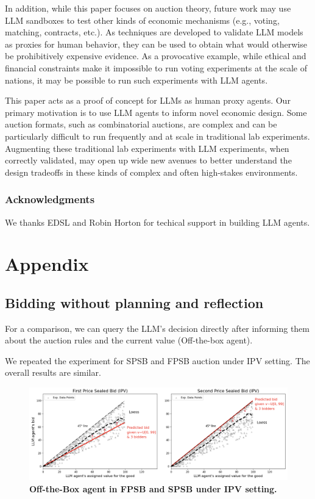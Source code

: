 \documentclass{article} %
\begin{document}
In addition, while this paper focuses on auction theory, future work may use LLM sandboxes to test other  kinds of
economic mechanisms (e.g., voting, matching, contracts, etc.). 
As techniques are developed to validate LLM models as proxies for human behavior, they can be used to obtain what would otherwise be prohibitively expensive evidence. 
As a provocative example, while ethical and financial constraints make it impossible to run voting experiments at the scale of nations, it may be possible to run such experiments with LLM agents. 

This paper acts as a proof of concept for LLMs as human proxy agents. 
Our primary motivation is to  use LLM agents to inform novel
economic design. 
Some auction formats, such as combinatorial auctions, are complex and can be  particularly difficult to run frequently and at scale in traditional lab experiments. 
Augmenting these traditional lab experiments with LLM experiments, when correctly validated, may open up wide new avenues 
to better understand the design tradeoffs in these kinds of complex and often high-stakes environments.


\subsubsection*{Acknowledgments}
We thanks EDSL and Robin Horton for techical support in building LLM agents.


% 



\appendix
\section{Appendix}

\subsection{Bidding without planning and reflection}

For a comparison, we can query the LLM's decision directly after informing them about the auction rules and the current value (Off-the-box agent). 

We repeated the experiment for SPSB and FPSB auction under IPV setting. 
The overall results are similar.

\begin{figure}[h]
    \centering \includegraphics[width=\linewidth]{Figs/FPSB_off-box.png}
    \caption{\textbf{ Off-the-Box agent in FPSB and SPSB under IPV setting.} }
    \label{fig:fpsb}

\end{figure}
\end{document}
